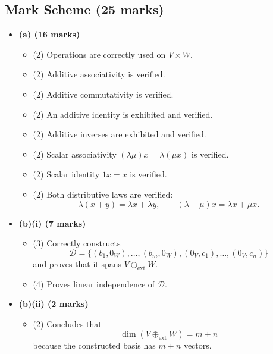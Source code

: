 \documentclass[12pt]{article}
\begin{document}
\subsection{Mark Scheme (25 marks)}
\begin{itemize}[leftmargin=1.6em]
  \item \textbf{(a) (16 marks)}
  \begin{itemize}[leftmargin=1.6em]
    \item (2) Operations are correctly used on \(V\times W\).
    \item (2) Additive associativity is verified.
    \item (2) Additive commutativity is verified.
    \item (2) An additive identity is exhibited and verified.
    \item (2) Additive inverses are exhibited and verified.
    \item (2) Scalar associativity \((\lambda\mu)x=\lambda(\mu x)\) is verified.
    \item (2) Scalar identity \(1x=x\) is verified.
    \item (2) Both distributive laws are verified:
    \[
    \lambda(x+y)=\lambda x+\lambda y,\qquad (\lambda+\mu)x=\lambda x+\mu x.
    \]
  \end{itemize}

  \item \textbf{(b)(i) (7 marks)}
  \begin{itemize}[leftmargin=1.6em]
    \item (3) Correctly constructs
    \[
    \mathcal D=\{(b_1,0_W),\ldots,(b_m,0_W),(0_V,c_1),\ldots,(0_V,c_n)\}
    \]
    and proves that it spans \(V\oplus_{\mathrm{ext}}W\).
    \item (4) Proves linear independence of \(\mathcal D\).
  \end{itemize}

  \item \textbf{(b)(ii) (2 marks)}
  \begin{itemize}[leftmargin=1.6em]
    \item (2) Concludes that
    \[
    \dim(V\oplus_{\mathrm{ext}}W)=m+n
    \]
    because the constructed basis has \(m+n\) vectors.
  \end{itemize}
\end{itemize}

\newpage
\end{document}
